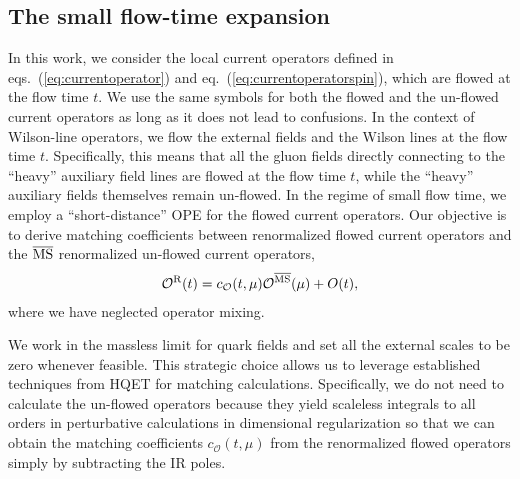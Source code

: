 \subsection{The small flow-time expansion}
\label{subsec:smallflowexp}
In this work, we consider the local current operators defined in eqs.~(\ref{eq:currentoperator}) and eq.~(\ref{eq:currentoperatorspin}), which are flowed at the flow time $t$. We use the same symbols for both the flowed and the un-flowed current operators as long as it does not lead to confusions. In the context of Wilson-line operators, we flow the external fields and the Wilson lines at the flow time $t$. Specifically, this means that all the gluon fields directly connecting to the ``heavy” auxiliary field lines are flowed at the flow time $t$, while the ``heavy” auxiliary fields themselves remain un-flowed. In the regime of small flow time, we employ a ``short-distance”  OPE  for the flowed current operators. Our objective is to derive matching coefficients between renormalized flowed current operators and the  $\overline{\rm MS}$ renormalized un-flowed current operators,
\begin{eqnarray}
\label{eq:smalltexpansion}
\mathcal{O}^{\rm R} (t)= c_{\mathcal{O}}(t, \mu)\mathcal{O}^{\overline{\rm MS}} (\mu) + O(t),
\end{eqnarray}
where we have neglected operator mixing. 


We work in the massless limit for quark fields and set all the external scales to be zero whenever feasible. 
This strategic choice allows us to leverage established techniques from HQET for matching calculations.  Specifically, we do not need to calculate the un-flowed operators because they yield scaleless integrals to all orders in perturbative calculations in dimensional regularization so that we can obtain the matching coefficients $c_{\mathcal{O}}(t, \mu)$ from the renormalized flowed operators simply by subtracting the IR poles.

